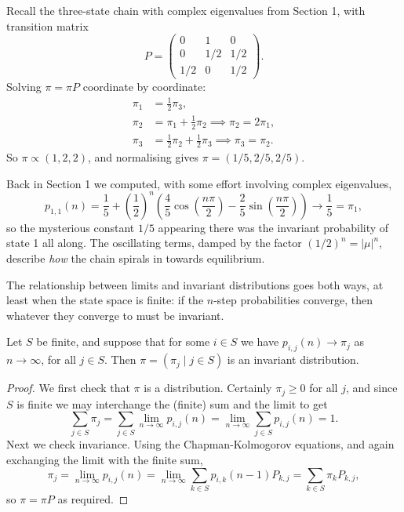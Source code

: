 \begin{example}
	Recall the three-state chain with complex eigenvalues from Section 1, with transition matrix
	$$
	P = \begin{pmatrix}
		0 & 1 & 0 \\
		0 & 1/2 & 1/2 \\
		1/2 & 0 & 1/2
	\end{pmatrix}.
	$$
	Solving $\pi = \pi P$ coordinate by coordinate:
	\begin{align*}
		\pi_1 &= \tfrac{1}{2}\pi_3, \\
		\pi_2 &= \pi_1 + \tfrac{1}{2}\pi_2 \implies \pi_2 = 2\pi_1, \\
		\pi_3 &= \tfrac{1}{2}\pi_2 + \tfrac{1}{2}\pi_3 \implies \pi_3 = \pi_2.
	\end{align*}
	So $\pi \propto (1, 2, 2)$, and normalising gives $\pi = (1/5, 2/5, 2/5)$.

	Back in Section 1 we computed, with some effort involving complex eigenvalues,
	$$
	p_{1,1}(n) = \frac{1}{5} + \left(\frac{1}{2}\right)^n \left(\frac{4}{5}\cos\left(\frac{n \pi}{2}\right) - \frac{2}{5} \sin \left(\frac{n \pi}{2}\right)\right) \longrightarrow \frac{1}{5} = \pi_1,
	$$
	so the mysterious constant $1/5$ appearing there was the invariant probability of state 1 all along. The oscillating terms, damped by the factor $(1/2)^n = |\mu|^n$, describe \emph{how} the chain spirals in towards equilibrium.
\end{example}

The relationship between limits and invariant distributions goes both ways, at least when the state space is finite: if the $n$-step probabilities converge, then whatever they converge to must be invariant.

\begin{theorem}
	Let $S$ be finite, and suppose that for some $i \in S$ we have
	$
	p_{i, j}(n) \rightarrow \pi_j
	$
	as $n \rightarrow \infty$, for all $j \in S$. Then $\pi = (\pi_j \mid j \in S)$ is an invariant distribution.
\end{theorem}
\begin{proof}
	We first check that $\pi$ is a distribution. Certainly $\pi_j \geq 0$ for all $j$, and since $S$ is finite we may interchange the (finite) sum and the limit to get
	$$
	\sum_{j \in S} \pi_j = \sum_{j \in S}\lim_{n \to \infty} p_{i, j}(n) = \lim_{n \to \infty}\sum_{j \in S} p_{i, j}(n) = 1.
	$$
	Next we check invariance. Using the Chapman-Kolmogorov equations, and again exchanging the limit with the finite sum,
	$$
	\pi_j = \lim_{n \to \infty} p_{i, j}(n) = \lim_{n \to \infty}\sum_{k \in S} p_{i, k}(n - 1)P_{k, j} = \sum_{k \in S} \pi_k P_{k, j},
	$$
	so $\pi = \pi P$ as required.
\end{proof}

